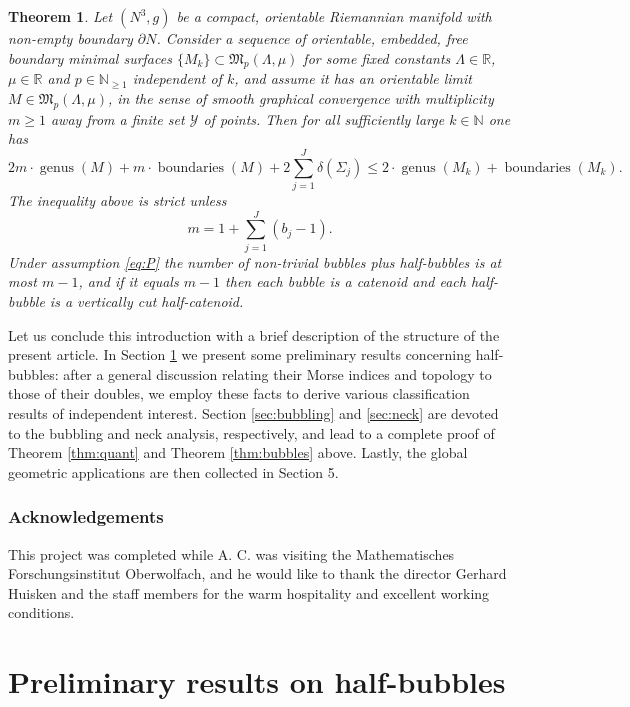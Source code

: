 \documentclass[JEP,XML,SOM,Unicode]{cedram}
\let\mathcal\mathscr
\DeclareMathOperator{\boundaries}{boundaries}
\DeclareMathOperator{\genus}{genus}
\newtheorem{thm}{Theorem}
\theoremstyle{definition}
\newcommand{\R}{\mathbb{R}}
\newcommand{\N}{\mathbb{N}}
\begin{document}
\begin{thm}\label{thm:lsc}
Let $(N^{3},g)$ be a compact, orientable Riemannian manifold with non-empty boundary $\partial N$.
Consider a sequence of orientable, embedded, free boundary minimal surfaces $\{M_k\}\subset \mathfrak{M}_p(\Lambda,\mu)$ for some fixed constants $\Lambda\in \R$, $\mu\in \R$ and $p\in\N_{\geq 1}$ independent of $k$, and assume it has an orientable limit
$M\in \mathfrak{M}_p(\Lambda,\mu)$, in the sense of smooth graphical convergence with multiplicity $m\geq 1$ away from a finite set $\mathcal{Y}$ of points.
Then for all sufficiently large $k\in\mathbb{N}$ one has
\begin{equation*}\label{eq:lsc}
2m\cdot \genus(M)+m\cdot \boundaries(M)
+2\sum_{j=1}^J\delta(\Sigma_j)
\leq 2 \cdot \genus(M_k)+\boundaries(M_k).
\end{equation*}
The inequality above is strict unless
\[
m=1+\sum_{j=1}^J(b_j-1).
\]
Under assumption \eqref{eq:P} the number of non-trivial bubbles plus half-bubbles is at most $m-1$, and if it equals $m-1$ then each bubble is a catenoid and each half-bubble is a vertically cut half-catenoid.
\end{thm}

Let us conclude this introduction with a brief description of the structure of the present article. In Section \ref{sec:prelim} we present some preliminary results concerning half-bubbles: after a general discussion relating their Morse indices and topology to those of their doubles, we employ these facts to derive various classification results of independent interest. Section \ref{sec:bubbling} and \ref{sec:neck} are devoted to the bubbling and neck analysis, respectively, and lead to a complete proof of Theorem \ref{thm:quant} and Theorem \ref{thm:bubbles} above. Lastly, the global geometric applications are then collected in Section 5.

\subsubsection*{Acknowledgements}
This project was completed while A. C. was visiting the Mathematisches Forschungsinstitut Oberwolfach, and he would like to thank the director Gerhard Huisken and the staff members for the warm hospitality and excellent working conditions.

\section{Preliminary results on half-bubbles}\label{sec:prelim}
\end{document}
